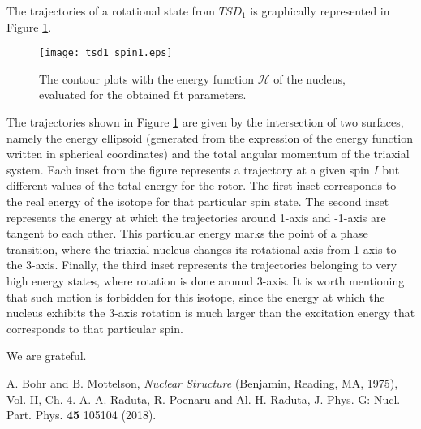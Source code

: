 \documentclass[myclassdoc,debug]{rjparticle}
\begin{document}
The trajectories of a rotational state from $TSD_1$  is graphically represented in Figure \ref{trajectory}.

\begin{figure}[ht]
    \centering
    \texttt{[image: tsd1\_spin1.eps]}
    \caption{The contour plots with the energy function $\mathcal{H}$ of the nucleus, evaluated for the obtained fit parameters.}
    \label{trajectory}
\end{figure}

The trajectories shown in Figure \ref{trajectory} are given by the intersection of two surfaces, namely the energy ellipsoid (generated from the expression of the energy function written in spherical coordinates) and the total angular momentum of the triaxial system. Each inset from the figure represents a trajectory at a given spin $I$ but different values of the total energy for the rotor. The first inset corresponds to the real energy of the isotope for that particular spin state. The second inset represents the energy at which the trajectories around 1-axis and -1-axis are tangent to each other. This particular energy marks the point of a phase transition, where the triaxial nucleus changes its rotational axis from 1-axis to the 3-axis. Finally, the third inset represents the trajectories belonging to very high energy states, where rotation is done around 3-axis. It is worth mentioning that such motion is forbidden for this isotope, since the energy at which the nucleus exhibits the 3-axis rotation is much larger than the excitation energy that corresponds to that particular spin.

\begin{acknowledgement}
We are grateful.
\end{acknowledgement}

\begin{thebibliography}{99}

A.  Bohr and B.  Mottelson, {\it Nuclear Structure} (Benjamin, Reading, MA, 1975), Vol.  II, Ch.  4. 
A.  A.  Raduta, R.  Poenaru and Al.  H.  Raduta, J.  Phys.  G: Nucl.  Part.  Phys.  {\bf 45} 105104 (2018). 

\end{thebibliography}
\end{document}
